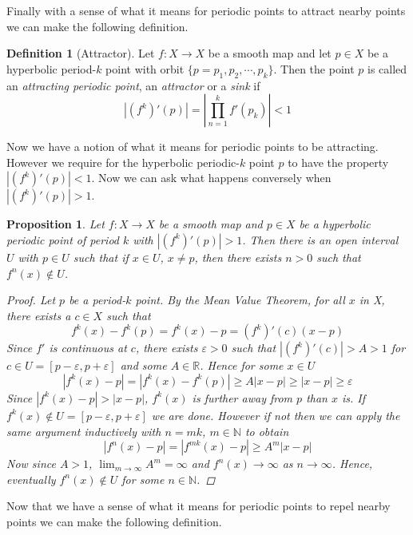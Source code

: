 \documentclass[11pt,a4paper,oneside]{memoir}
\theoremstyle{plain}
\newtheorem{prop}[thm]{Proposition}
\theoremstyle{definition}
\newtheorem{defn}[thm]{Definition}
\begin{document}
Finally with a sense of what it means for periodic points to attract nearby points we can make the following definition.

\begin{defn}[Attractor] \label{def:attractor}
    Let $f: X \to X$ be a smooth map and let $p \in X$ be a hyperbolic period-$k$ point with orbit $\lbrace p = p_1, p_2, \cdots, p_k \rbrace$. Then the point $p$ is called an \emph{attracting periodic point}, an \emph{attractor} or a \emph{sink} if \[|(f^k)'(p)| = \left\lvert \prod_{n = 1}^k f'(p_k) \right\rvert < 1\]
\end{defn}

Now we have a notion of what it means for periodic points to be attracting. However we require for the hyperbolic periodic-$k$ point $p$ to have the property $|(f^k)'(p)| < 1$. Now we can ask what happens conversely when $|(f^k)'(p)| > 1$.

\begin{prop} \label{prop:repellor}
    Let $f: X \to X$ be a smooth map and $p \in X$ be a hyperbolic periodic point of period $k$ with $|(f^k)'(p)| > 1$. Then there is an open interval $U$ with $p \in U$ such that if $x \in U$, $x \neq p$, then there exists $n > 0$ such that $f^n(x) \notin U$.

    \begin{proof}
        Let $p$ be a period-$k$ point. By the Mean Value Theorem, for all $x$ in X, there exists a $c \in X$ such that \[f^k(x) - f^k(p) = f^k(x) - p = (f^k)'(c)(x - p)\] Since $f'$ is continuous at $c$, there exists $\varepsilon > 0$ such that $|(f^k)'(c)| > A > 1$ for $c \in U = [p - \varepsilon, p + \varepsilon]$ and some $A \in \mathbb{R}$. Hence for some $x \in U$ \[|f^k(x) - p| = |f^k(x) - f^k(p)| \geq A|x - p| \geq |x - p| \geq \varepsilon\] Since $|f^k(x) - p| > |x - p|$, $f^k(x)$ is further away from $p$ than $x$ is. If $f^k(x) \notin U = [p - \varepsilon, p + \varepsilon]$ we are done. However if not then we can apply the same argument inductively with $n = mk$, $m \in \mathbb{N}$ to obtain \[ |f^n(x) - p| = |f^{mk}(x) - p| \geq A^m|x - p|\] Now since $A > 1$, $\lim_{m \to \infty}A^m = \infty$ and $f^n(x) \to \infty$ as $n \to \infty$. Hence, eventually $f^n(x) \notin U$ for some $n \in \mathbb{N}$.
    \end{proof}
\end{prop}

Now that we have a sense of what it means for periodic points to repel nearby points we can make the following definition.
\end{document}
